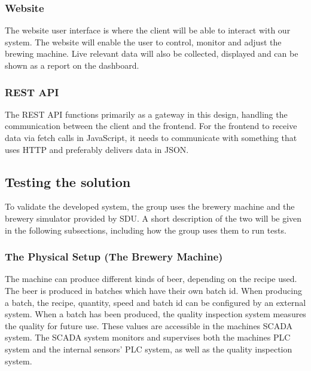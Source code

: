\subsubsection{Website}
The website user interface is where the client will be able to interact with
our system. The website will enable the user to control, monitor and adjust
the brewing machine. Live relevant data will also be collected, displayed and
can be shown as a report on the dashboard.


\subsubsection{REST API}
The REST API functions primarily as a gateway in this design, handling the
communication between the client and the frontend. For the
frontend to receive data via fetch calls in JavaScript, it needs to communicate 
with something that uses HTTP and preferably delivers data in JSON.


\subsection{Testing the solution}
To validate the developed system, the group uses the brewery machine and the
brewery simulator provided by SDU. A short description of the two will be given
in the following subsections, including how the group uses them to run tests.

\subsubsection{The Physical Setup (The Brewery Machine)}
The machine can produce different kinds of beer, depending on the recipe used.
The beer is produced in batches which have their own batch id. When producing a
batch, the recipe, quantity, speed and batch id can be configured by an external
system. When a batch has been produced, the quality inspection system measures
the quality for future use. These values are accessible in the machines SCADA
system. The SCADA system monitors and supervises both the machines PLC system
and the internal sensors' PLC system, as well as the quality inspection system.\\

